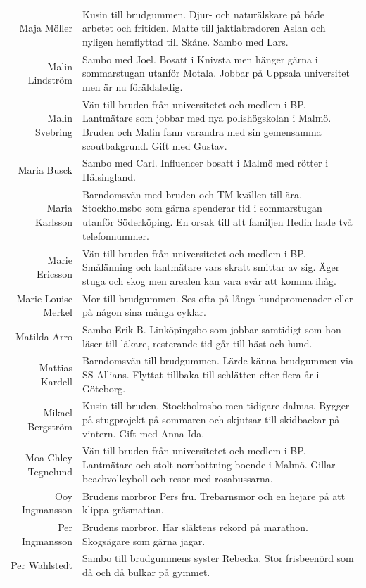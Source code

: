 \documentclass[a5paper]{article}
\begin{document}
\begin{longtable}[l]{N|L}
				Maja Möller	&	Kusin till brudgummen. Djur- och naturälskare på både arbetet och fritiden. Matte till jaktlabradoren Aslan och nyligen hemflyttad till Skåne. Sambo med Lars.	\\
				Malin Lindström	&	Sambo med Joel. Bosatt i Knivsta men hänger gärna i sommarstugan utanför Motala. Jobbar på Uppsala universitet men är nu föräldaledig.	\\
				Malin Svebring	&	Vän till bruden från universitetet och medlem i BP. Lantmätare som jobbar med nya polishögskolan i Malmö. Bruden och Malin fann varandra med sin gemensamma scoutbakgrund. Gift med Gustav.	\\
				Maria Busck	&	Sambo med Carl. Influencer bosatt i Malmö med rötter i Hälsingland. 	\\
				Maria Karlsson	&	Barndomsvän med bruden och TM kvällen till ära. Stockholmsbo som gärna spenderar tid i sommarstugan utanför Söderköping. En orsak till att familjen Hedin hade två telefonnummer.	\\
				Marie Ericsson	&	Vän till bruden från universitetet och medlem i BP. Smålänning och lantmätare vars skratt smittar av sig. Äger stuga och skog men arealen kan vara svår att komma ihåg.	\\
				Marie-Louise Merkel	&	Mor till brudgummen. Ses ofta på långa hundpromenader eller på någon sina många cyklar.  	\\
				Matilda Arro	&	Sambo Erik B. Linköpingsbo som jobbar samtidigt som hon läser till läkare, resterande tid går till häst och hund. 	\\
				Mattias Kardell	&	Barndomsvän till brudgummen. Lärde känna brudgummen via SS Allians. Flyttat tillbaka till schlätten efter flera år i Göteborg.	\\
				Mikael Bergström	&	Kusin till bruden. Stockholmsbo men tidigare dalmas. Bygger på stugprojekt på sommaren och skjutsar till skidbackar på vintern. Gift med Anna-Ida.	\\
				Moa Chley Tegnelund	&	Vän till bruden från universitetet och medlem i BP. Lantmätare och stolt norrbottning boende i Malmö. Gillar beachvolleyboll och resor med rosabussarna.  	\\
				Ooy Ingmansson	&	Brudens morbror Pers fru. Trebarnsmor och en hejare på att klippa gräsmattan.	\\
				Per Ingmansson	&	Brudens morbror. Har släktens rekord på marathon. Skogsägare som gärna jagar. 	\\
				Per Wahlstedt	&	Sambo till brudgummens syster Rebecka. Stor frisbeenörd som då och då bulkar på gymmet. 	\\

\end{longtable}
\end{document}
